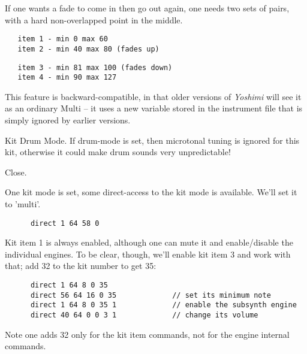    If one wants a fade to come in then go out again, one needs two sets of pairs,
   with a hard non-overlapped point in the middle.

   \begin{verbatim}
   item 1 - min 0 max 60
   item 2 - min 40 max 80 (fades up)
   \end{verbatim}

   \begin{verbatim}
   item 3 - min 81 max 100 (fades down)
   item 4 - min 90 max 127
   \end{verbatim}

   This feature is backward-compatible, in that older versions of
   \textsl{Yoshimi} will
   see it as an ordinary Multi -- it uses a new variable stored in the
   instrument file that is simply ignored by earlier versions.

   Kit Drum Mode.
   If drum-mode  is set, then microtonal tuning is ignored for this kit,
   otherwise it could make drum sounds very unpredictable!

   Close.

   One kit mode is set, some direct-access to the kit mode is available.
 	We'll set it to 'multi'.

   \begin{verbatim}
      direct 1 64 58 0
   \end{verbatim}

   Kit item 1 is always enabled, although one can mute it and enable/disable the
   individual engines.  To be clear, though, we'll enable kit item 3 and work
   with that; add 32 to the kit number to get 35:

   \begin{verbatim}
      direct 1 64 8 0 35
      direct 56 64 16 0 35             // set its minimum note
      direct 1 64 8 0 35 1             // enable the subsynth engine
      direct 40 64 0 0 3 1             // change its volume
   \end{verbatim}

   Note one adds 32 only for the kit item commands, not for the engine internal
   commands.

